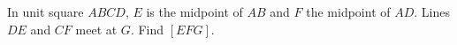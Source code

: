 In unit square $ ABCD $, $ E $ is the midpoint of $ AB $ and $ F $ the midpoint of $ AD $. Lines $ DE $ and $ CF $ meet at $ G $. Find $[EFG]$.
